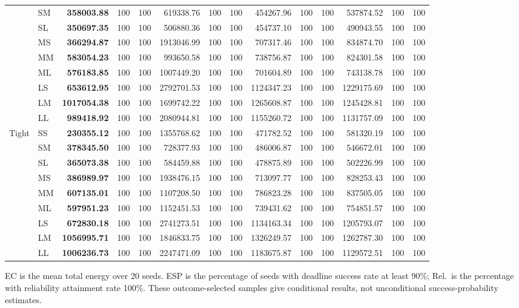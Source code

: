 \begin{table}[!t]
\begin{tabular}{@{}ll*{4}{rcc}@{}}
 & SM & \textbf{358003.88} & 100 & 100 & 619338.76 & 100 & 100 & 454267.96 & 100 & 100 & 537874.52 & 100 & 100 \\
 & SL & \textbf{350697.35} & 100 & 100 & 506880.36 & 100 & 100 & 454737.10 & 100 & 100 & 490943.55 & 100 & 100 \\
 & MS & \textbf{366294.87} & 100 & 100 & 1913046.99 & 100 & 100 & 707317.46 & 100 & 100 & 834874.70 & 100 & 100 \\
 & MM & \textbf{583054.23} & 100 & 100 & 993650.58 & 100 & 100 & 738756.87 & 100 & 100 & 824301.58 & 100 & 100 \\
 & ML & \textbf{576183.85} & 100 & 100 & 1007449.20 & 100 & 100 & 701604.89 & 100 & 100 & 743138.78 & 100 & 100 \\
 & LS & \textbf{653612.95} & 100 & 100 & 2792701.53 & 100 & 100 & 1124347.23 & 100 & 100 & 1229175.69 & 100 & 100 \\
 & LM & \textbf{1017054.38} & 100 & 100 & 1699742.22 & 100 & 100 & 1265608.87 & 100 & 100 & 1245428.81 & 100 & 100 \\
 & LL & \textbf{989418.92} & 100 & 100 & 2080944.81 & 100 & 100 & 1155260.72 & 100 & 100 & 1131757.09 & 100 & 100 \\
\midrule
Tight & SS & \textbf{230355.12} & 100 & 100 & 1355768.62 & 100 & 100 & 471782.52 & 100 & 100 & 581320.19 & 100 & 100 \\
 & SM & \textbf{378345.50} & 100 & 100 & 728377.93 & 100 & 100 & 486006.87 & 100 & 100 & 546672.01 & 100 & 100 \\
 & SL & \textbf{365073.38} & 100 & 100 & 584459.88 & 100 & 100 & 478875.89 & 100 & 100 & 502226.99 & 100 & 100 \\
 & MS & \textbf{386989.97} & 100 & 100 & 1938476.15 & 100 & 100 & 713097.77 & 100 & 100 & 828253.43 & 100 & 100 \\
 & MM & \textbf{607135.01} & 100 & 100 & 1107208.50 & 100 & 100 & 786823.28 & 100 & 100 & 837505.05 & 100 & 100 \\
 & ML & \textbf{597951.23} & 100 & 100 & 1152451.53 & 100 & 100 & 739431.62 & 100 & 100 & 754851.57 & 100 & 100 \\
 & LS & \textbf{672830.18} & 100 & 100 & 2741273.51 & 100 & 100 & 1134163.34 & 100 & 100 & 1205793.07 & 100 & 100 \\
 & LM & \textbf{1056995.71} & 100 & 100 & 1846833.75 & 100 & 100 & 1326249.57 & 100 & 100 & 1262787.30 & 100 & 100 \\
 & LL & \textbf{1006236.73} & 100 & 100 & 2247471.09 & 100 & 100 & 1183675.87 & 100 & 100 & 1129572.51 & 100 & 100 \\
\bottomrule
\end{tabular}
\par\smallskip
\begin{minipage}{\textwidth}\scriptsize
EC is the mean total energy over 20 seeds. ESP is the percentage of seeds with deadline success rate at least 90\%; Rel.\ is the percentage with reliability attainment rate 100\%. These outcome-selected samples give conditional results, not unconditional success-probability estimates.
\end{minipage}
\end{table}
